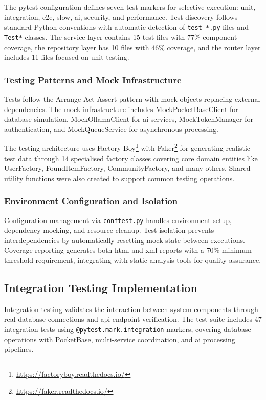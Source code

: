 The pytest configuration defines seven test markers for selective execution: unit, integration, e2e, slow, ai, security, and performance. Test discovery follows standard Python conventions with automatic detection of \texttt{test\_*.py} files and \texttt{Test*} classes. The service layer contains 15 test files with 77\% component coverage, the repository layer has 10 files with 46\% coverage, and the router layer includes 11 files focused on unit testing.

\subsubsection{Testing Patterns and Mock Infrastructure}

Tests follow the Arrange-Act-Assert pattern \cite{Wake2001,Beck2002} with mock objects replacing external dependencies. The mock infrastructure includes MockPocketBaseClient for database simulation, MockOllamaClient for \ac{ai} services, MockTokenManager for authentication, and MockQueueService for asynchronous processing.

The testing architecture uses Factory Boy\footnote{\url{https://factoryboy.readthedocs.io/}} with Faker\footnote{\url{https://faker.readthedocs.io/}} for generating realistic test data through 14 specialised factory classes covering core domain entities like UserFactory, FoundItemFactory, CommunityFactory, and many others. Shared utility functions were also created to support common testing operations.

\subsubsection{Environment Configuration and Isolation}

Configuration management via \texttt{conftest.py} handles environment setup, dependency mocking, and resource cleanup. Test isolation prevents interdependencies by automatically resetting mock state between executions. Coverage reporting generates both \ac{html} and \ac{xml} reports with a 70\% minimum threshold requirement, integrating with static analysis tools for quality assurance.

\subsection{Integration Testing Implementation} \label{subsection:integration_testing_implementation}

Integration testing validates the interaction between system components through real database connections and \ac{api} endpoint verification. The test suite includes 47 integration tests using \texttt{@pytest.mark.integration} markers, covering database operations with PocketBase, multi-service coordination, and \ac{ai} processing pipelines.

